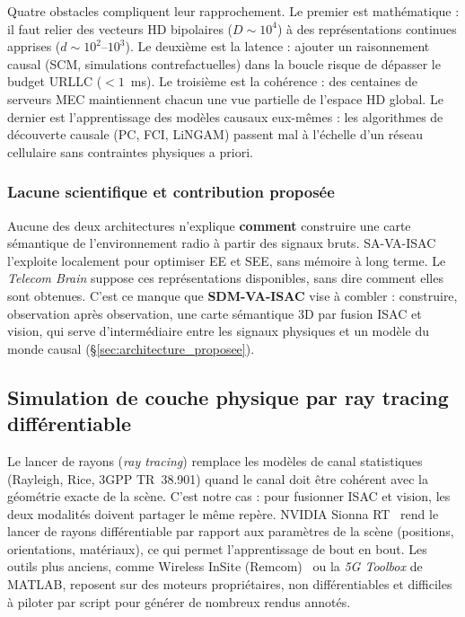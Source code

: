 \documentclass[12pt,a4paper,titlepage]{article}
\begin{document}
Quatre obstacles compliquent leur rapprochement. Le premier est mathématique : il faut relier des vecteurs HD bipolaires ($D\sim10^4$) à des représentations continues apprises ($d\sim10^2$--$10^3$). Le deuxième est la latence : ajouter un raisonnement causal (SCM, simulations contrefactuelles) dans la boucle risque de dépasser le budget URLLC ($<1$~ms). Le troisième est la cohérence : des centaines de serveurs MEC maintiennent chacun une vue partielle de l'espace HD global. Le dernier est l'apprentissage des modèles causaux eux-mêmes : les algorithmes de découverte causale (PC, FCI, LiNGAM) passent mal à l'échelle d'un réseau cellulaire sans contraintes physiques a priori.

\subsubsection{Lacune scientifique et contribution proposée}

Aucune des deux architectures n'explique \textbf{comment} construire une carte sémantique de l'environnement radio à partir des signaux bruts. SA-VA-ISAC l'exploite localement pour optimiser EE et SEE, sans mémoire à long terme. Le \textit{Telecom Brain} suppose ces représentations disponibles, sans dire comment elles sont obtenues. C'est ce manque que \textbf{SDM-VA-ISAC} vise à combler : construire, observation après observation, une carte sémantique 3D par fusion ISAC et vision, qui serve d'intermédiaire entre les signaux physiques et un modèle du monde causal (\S\ref{sec:architecture_proposee}).

\subsection{Simulation de couche physique par ray tracing différentiable}
\label{subsec:art_rt}

Le lancer de rayons (\textit{ray tracing}) remplace les modèles de canal statistiques (Rayleigh, Rice, 3GPP TR~38.901) quand le canal doit être cohérent avec la géométrie exacte de la scène. C'est notre cas : pour fusionner ISAC et vision, les deux modalités doivent partager le même repère. NVIDIA Sionna RT~\cite{sionna_rt_2} rend le lancer de rayons différentiable par rapport aux paramètres de la scène (positions, orientations, matériaux), ce qui permet l'apprentissage de bout en bout. Les outils plus anciens, comme Wireless InSite (Remcom)~\cite{remcom_wi} ou la \textit{5G Toolbox} de MATLAB, reposent sur des moteurs propriétaires, non différentiables et difficiles à piloter par script pour générer de nombreux rendus annotés.
\end{document}
